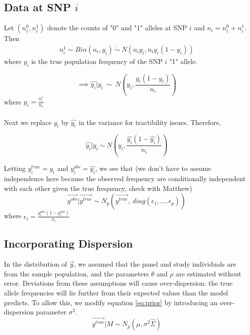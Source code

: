 \documentclass[10pt,a4paper,draft]{article}
\begin{document}
\iffalse
The distribution of $\{y_j: j \neq t\}$ given the test SNP,
\begin{equation}
\{y_i: i \neq t\} | y_t \sim N_{p-1}(\bar{\mu}, \bar{\Sigma}) \label{cond}
\end{equation}
where
\begin{align*}
\bar{\mu} = \vec{\mu_{i \neq t}} + \Sigma_{i \neq t, t}\frac{1}{\sigma_t^2}(y_t-\mu_{t}) 
\end{align*}
and
\begin{align*}
\hat{\Sigma} = \Sigma_{i \neq t, i \neq t} - \Sigma_{i \neq t, t}\frac{1}{\sigma_t^2}\Sigma_{t, i \neq t}
\end{align*}
\fi

\subsection{Data at SNP $i$}
Let $(n_i^0, n_i^1)$ denote the counts of "0" and "1" alleles at SNP $i$ and $n_i = n_i^0 + n_i^1$. Then 
\begin{align*}
n_i^1 \sim Bin(n_i, y_i) \ \dot{\sim}  \ N(n_iy_i, n_iy_i(1-y_i)) \label{eq:napprox}
\end{align*}
where $y_i$ is the true population frequency of the SNP $i$ "1" allele. 


\begin{equation}
\implies  \hat{y_i} | y_i \ \sim \ N(y_i, \frac{y_i(1-y_i)}{n_i})
\end{equation}
where $\hat{y_i} = \frac{n_i^1}{n_i}$ \\
\\
Next we replace $y_i$ by $\hat{y_i}$ in the variance for tractibility issues. Therefore,

\begin{equation}
\hat{y_i} | y_i \ \dot{\sim} \ N(y_i, \frac{\hat{y_i}(1-\hat{y_i})}{n_i}) \label{bin}
\end{equation}

Letting $y^{true}_i = y_i$ and $y^{obs}_i = \hat{y_i}$,  we see that (we don't have to assume independence here because the observed frequency are conditionally independent with each other given the true frequency, check with Matthew)
\begin{equation}
\vec{y^{obs}} | \vec{y^{true}} \sim N_p(\vec{y^{true}}, \ diag(\epsilon_1,...,\epsilon_p))
\end{equation}
where $\epsilon_i = \frac{y^{obs}_i (1-y^{obs}_i)}{n_i}$ 

\subsection{Incorporating Dispersion}
In the distribution of $\vec{y}$, we assumed that the panel and study individuals are from the sample population, and the parameters $\theta$ and $\rho$ are estimated without error. Deviations from these assumptions will cause over-dispersion: the true allele frequencies will lie further from their expected values than the model predicts. To allow this, we modify equation \ref{eq:prior} by introducing an over-dispersion parameter $\sigma^2$.
\begin{equation}
\vec{y^{true}}|M \sim N_p(\hat{\mu}, \sigma^2\hat{\Sigma})
\end{equation}
\end{document}
